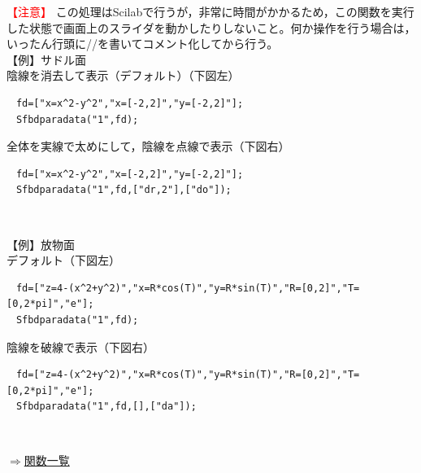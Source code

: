 \documentclass[papersize,a4paper,12pt,uplatex]{jsarticle}
\begin{document}
\begin{description}
 \textcolor{red}{【注意】} この処理はScilabで行うが，非常に時間がかかるため，この関数を実行した状態で画面上のスライダを動かしたりしないこと。何か操作を行う場合は，いったん行頭に//を書いてコメント化してから行う。\\
 
【例】サドル面\\
陰線を消去して表示（デフォルト）（下図左）
\begin{verbatim}
　fd=["x=x^2-y^2","x=[-2,2]","y=[-2,2]"];
　Sfbdparadata("1",fd);
\end{verbatim}
全体を実線で太めにして，陰線を点線で表示（下図右）
\begin{verbatim}
　fd=["x=x^2-y^2","x=[-2,2]","y=[-2,2]"];
　Sfbdparadata("1",fd,["dr,2"],["do"]);
\end{verbatim}
　　　　　

【例】放物面\\
デフォルト（下図左）
\begin{verbatim}
　fd=["z=4-(x^2+y^2)","x=R*cos(T)","y=R*sin(T)","R=[0,2]","T=[0,2*pi]","e"];
　Sfbdparadata("1",fd);
\end{verbatim}
陰線を破線で表示（下図右）
\begin{verbatim}
　fd=["z=4-(x^2+y^2)","x=R*cos(T)","y=R*sin(T)","R=[0,2]","T=[0,2*pi]","e"];
　Sfbdparadata("1",fd,[],["da"]);
\end{verbatim}
　　　　　

\begin{flushright} \hyperlink{functionlist3d}{$\Rightarrow$関数一覧}\end{flushright}


\end{description}
\end{document}
